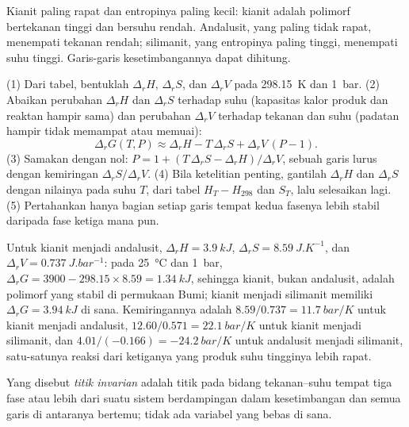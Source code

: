 Kianit paling rapat dan entropinya paling kecil: kianit adalah polimorf bertekanan tinggi dan
bersuhu rendah. Andalusit, yang paling tidak rapat, menempati tekanan rendah; silimanit,
yang entropinya paling tinggi, menempati suhu tinggi. Garis-garis kesetimbangannya dapat dihitung.

\begin{method}\label{met:b2:metamorphic-facies:line}
(1) Dari tabel, bentuklah $\Delta_r H$, $\Delta_r S$, dan $\Delta_r V$ pada \qty{298.15}{K}
dan \qty{1}{bar}. (2) Abaikan perubahan $\Delta_r H$ dan $\Delta_r S$ terhadap
suhu (kapasitas kalor produk dan reaktan hampir sama) dan perubahan $\Delta_r V$
terhadap tekanan dan suhu (padatan hampir tidak memampat atau memuai):
\[
\Delta_r G(T, P) \approx \Delta_r H - T\,\Delta_r S + \Delta_r V\,(P - 1).
\]
(3) Samakan dengan nol: $P = 1 + (T\,\Delta_r S - \Delta_r H)/\Delta_r V$, sebuah garis lurus dengan
kemiringan $\Delta_r S/\Delta_r V$. (4) Bila ketelitian penting, gantilah $\Delta_r H$ dan
$\Delta_r S$ dengan nilainya pada suhu $T$, dari tabel $H_T - H_{298}$ dan $S_T$,
lalu selesaikan lagi. (5) Pertahankan hanya bagian setiap garis tempat kedua fasenya lebih stabil
daripada fase ketiga mana pun.
\end{method}

Untuk kianit menjadi andalusit, $\Delta_r H = \qty{3.9}{kJ}$, $\Delta_r S =
\qty{8.59}{J.K^{-1}}$, dan $\Delta_r V = \qty{0.737}{J.bar^{-1}}$: pada \qty{25}{\celsius}
dan \qty{1}{bar}, $\Delta_r G = 3900 - 298.15\times8.59 = \qty{+1.34}{kJ}$, sehingga kianit,
bukan andalusit, adalah polimorf yang stabil di permukaan Bumi; kianit menjadi silimanit memiliki
$\Delta_r G = \qty{+3.94}{kJ}$ di sana. Kemiringannya adalah $8.59/0.737 = \qty{11.7}{bar/K}$ untuk
kianit menjadi andalusit, $12.60/0.571 = \qty{22.1}{bar/K}$ untuk kianit menjadi silimanit, dan
$4.01/(-0.166) = \qty{-24.2}{bar/K}$ untuk andalusit menjadi silimanit, satu-satunya reaksi dari
ketiganya yang produk suhu tingginya lebih rapat.

\begin{definition}\label{def:b2:metamorphic-facies:invariant}
Yang disebut \emph{titik invarian} adalah titik pada bidang
tekanan--suhu tempat tiga fase atau lebih dari suatu sistem berdampingan dalam
kesetimbangan dan semua garis  di antaranya bertemu; tidak ada variabel yang bebas di sana.
\end{definition}

